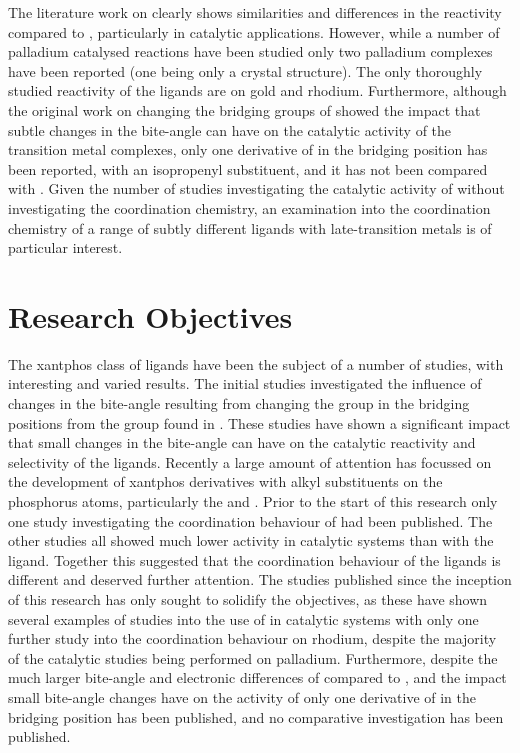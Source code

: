 The literature work on \tBuxantphos{} clearly shows similarities and differences in the reactivity compared to \Phxantphos{}, particularly in catalytic applications.  However, while a number of palladium catalysed reactions have been studied only two palladium complexes have been reported (one being only a crystal structure).  The only thoroughly studied reactivity of the \tBuxantphos{} ligands are on gold and rhodium.\cite{Partyka2010, Haibach2013}  Furthermore, although the original work on changing the bridging groups of \Phxantphos{} showed the impact that subtle changes in the bite-angle can have on the catalytic activity of the transition metal complexes, only one derivative of \tBuxantphos{} in the bridging position has been reported, with an isopropenyl substituent, and it has not been compared with \tBuxantphos.\cite{Marimuthu2012}  Given the number of studies investigating the catalytic activity of \tBuxantphos{} without investigating the coordination chemistry, an examination into the coordination chemistry of a range of subtly different \tBuxantphos{} ligands with late-transition metals is of particular interest.   

\section{Research Objectives}

The xantphos class of ligands have been the subject of a number of studies, with interesting and varied results.  The initial studies investigated the influence of changes in the bite-angle resulting from changing the group in the bridging positions from the  group found in \Phxantphos.  These studies have shown a significant impact that small changes in the bite-angle can have on the catalytic reactivity and selectivity of the ligands.  Recently a large amount of attention has focussed on the development of xantphos derivatives with alkyl substituents on the phosphorus atoms, particularly the \iPrxantphos{} and \tBuxantphos{}.  Prior to the start of this research only one study investigating the coordination behaviour of \tBuxantphos{} had been published.  The other studies all showed much lower activity in catalytic systems than with the \Phxantphos{} ligand.  Together this suggested that the coordination behaviour of the ligands is different and deserved further attention.  The studies published since the inception of this research has only sought to solidify the objectives, as these have shown several examples of studies into the use of \tBuxantphos{} in catalytic systems with only one further study into the coordination behaviour on rhodium, despite the majority of the catalytic studies being performed on palladium.  Furthermore, despite the much larger bite-angle and electronic differences of \tBuxantphos{} compared to \Phxantphos, and the impact small bite-angle changes have on the activity of \Phxantphos{} only one derivative of \tBuxantphos{} in the bridging position has been published, and no comparative investigation has been published.

